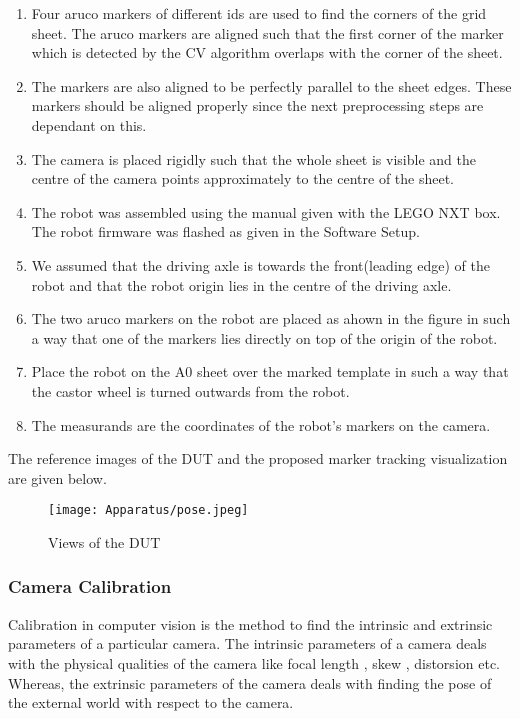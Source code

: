 \documentclass[10pt,a4paper]{article}
\begin{document}
\begin{enumerate}
	\item
	Four aruco markers of different ids are used to find the corners of the grid sheet. The aruco markers are aligned such that the first corner of the marker which is detected by the CV algorithm overlaps with the corner of the sheet.
	\item
	The markers are also aligned to be perfectly parallel to the sheet edges. These markers should be aligned properly since the next preprocessing steps are dependant on this.
	\item
	The camera is placed rigidly such that the whole sheet is visible and the centre of the camera points approximately to the centre of the sheet.	
    \item
    The robot was assembled using the manual given with the LEGO NXT box. The robot firmware was flashed as given in the Software Setup. 
    \item
    We assumed that the driving axle is towards the front(leading edge) of the robot and that the robot origin lies in the centre of the driving axle.
    \item
    The two aruco markers on the robot are placed as ahown in the figure in such a way that one of the markers lies directly on top of the origin of the robot.
    \item
    Place the robot on the A0 sheet over the marked template in such a way that the castor wheel is turned outwards from the robot.
    \item
	The measurands are the coordinates of the robot's markers on the camera.
    
\end{enumerate}
\vspace{0.5cm}

The reference images of the DUT and the proposed marker tracking visualization are given below.

\begin{figure}[h]
	\centering
\texttt{[image: Apparatus/pose.jpeg]}
\caption{ Views of the DUT}
\end{figure}

\subsubsection{Camera Calibration}


Calibration in computer vision is the method to find the intrinsic and extrinsic parameters of a particular camera. The intrinsic parameters of a camera deals with the physical qualities of the camera like focal length , skew , distorsion etc. Whereas, the extrinsic parameters of the camera deals with finding the pose of the external world with respect to the camera.\\
\end{document}
